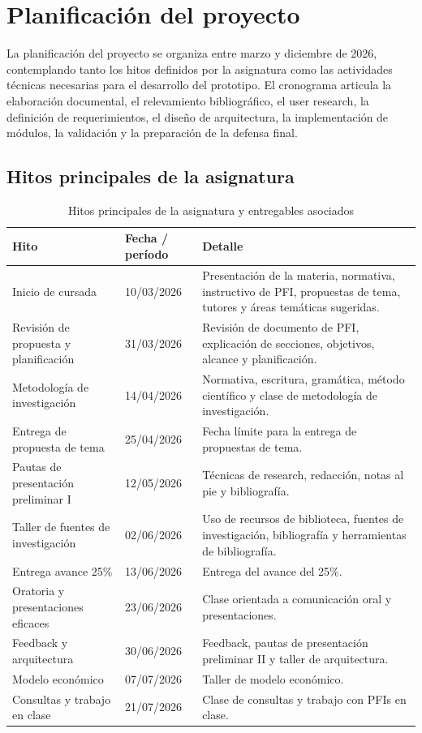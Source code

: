 \chapter{Planificación del proyecto}

La planificación del proyecto se organiza entre marzo y diciembre de 2026, contemplando tanto los hitos definidos por la asignatura como las actividades técnicas necesarias para el desarrollo del prototipo. El cronograma articula la elaboración documental, el relevamiento bibliográfico, el user research, la definición de requerimientos, el diseño de arquitectura, la implementación de módulos, la validación y la preparación de la defensa final.

\section{Hitos principales de la asignatura}

\begin{table}[H]
\centering
\caption{Hitos principales de la asignatura y entregables asociados}
\label{tab:hitos_pfi}
\small
\begin{tabularx}{\textwidth}{p{} p{} X}
\hline
\textbf{Hito} & \textbf{Fecha / período} & \textbf{Detalle} \\
\hline
Inicio de cursada & 10/03/2026 & Presentación de la materia, normativa, instructivo de PFI, propuestas de tema, tutores y áreas temáticas sugeridas. \\
Revisión de propuesta y planificación & 31/03/2026 & Revisión de documento de PFI, explicación de secciones, objetivos, alcance y planificación. \\
Metodología de investigación & 14/04/2026 & Normativa, escritura, gramática, método científico y clase de metodología de investigación. \\
Entrega de propuesta de tema & 25/04/2026 & Fecha límite para la entrega de propuestas de tema. \\
Pautas de presentación preliminar I & 12/05/2026 & Técnicas de research, redacción, notas al pie y bibliografía. \\
Taller de fuentes de investigación & 02/06/2026 & Uso de recursos de biblioteca, fuentes de investigación, bibliografía y herramientas de bibliografía. \\
Entrega avance 25\% & 13/06/2026 & Entrega del avance del 25\%. \\
Oratoria y presentaciones eficaces & 23/06/2026 & Clase orientada a comunicación oral y presentaciones. \\
Feedback y arquitectura & 30/06/2026 & Feedback, pautas de presentación preliminar II y taller de arquitectura. \\
Modelo económico & 07/07/2026 & Taller de modelo económico. \\
Consultas y trabajo en clase & 21/07/2026 & Clase de consultas y trabajo con PFIs en clase. \\
\hline
\end{tabularx}
\end{table}

